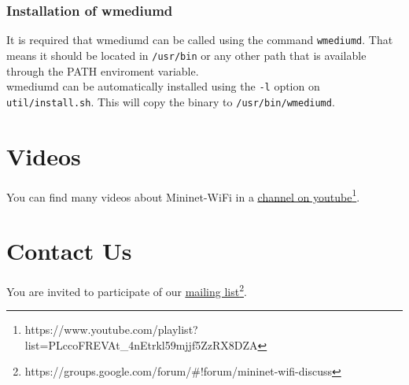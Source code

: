 \subsubsection{Installation of wmediumd}
It is required that wmediumd can be called using the command \texttt{wmediumd}. That means it should be located in \texttt{/usr/bin} or any other path that is available through the PATH enviroment variable.\\
wmediumd can be automatically installed using the \texttt{-l} option on \texttt{util/install.sh}. This will copy the binary to \texttt{/usr/bin/wmediumd}.





\section{Videos}
You can find many videos about Mininet-WiFi in a \underline{\href{https://www.youtube.com/playlist?list=PLccoFREVAt\_4nEtrkl59mjjf5ZzRX8DZA}{channel on youtube}}\footnote{https://www.youtube.com/playlist?list=PLccoFREVAt\_4nEtrkl59mjjf5ZzRX8DZA}.

\section{Contact Us}
You are invited to participate of our \underline{\href{https://groups.google.com/forum/\#!forum/mininet-wifi-discuss}{mailing list}}\footnote{https://groups.google.com/forum/\#!forum/mininet-wifi-discuss}.



